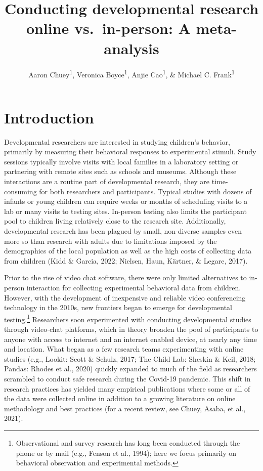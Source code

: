 \documentclass[
  man,floatsintext]{apa6}
\title{Conducting developmental research online vs.~in-person: A meta-analysis}
\author{Aaron Chuey\textsuperscript{1}, Veronica Boyce\textsuperscript{1}, Anjie Cao\textsuperscript{1}, \& Michael C. Frank\textsuperscript{1}}
\date{}
\affiliation{\vspace{0.5cm}\textsuperscript{1} Stanford University, Department of Psychology}
\begin{document}
\maketitle

\hypertarget{introduction}{%
\section{Introduction}\label{introduction}}

Developmental researchers are interested in studying children's behavior, primarily by measuring their behavioral responses to experimental stimuli. Study sessions typically involve visits with local families in a laboratory setting or partnering with remote sites such as schools and museums. Although these interactions are a routine part of developmental research, they are time-consuming for both researchers and participants. Typical studies with dozens of infants or young children can require weeks or months of scheduling visits to a lab or many visits to testing sites. In-person testing also limits the participant pool to children living relatively close to the research site. Additionally, developmental research has been plagued by small, non-diverse samples even more so than research with adults due to limitations imposed by the demographics of the local population as well as the high costs of collecting data from children (Kidd \& Garcia, 2022; Nielsen, Haun, Kärtner, \& Legare, 2017).

Prior to the rise of video chat software, there were only limited alternatives to in-person interaction for collecting experimental behavioral data from children. However, with the development of inexpensive and reliable video conferencing technology in the 2010s, new frontiers began to emerge for developmental testing.\footnote{Observational and survey research has long been conducted through the phone or by mail (e.g., Fenson et al., 1994); here we focus primarily on behavioral observation and experimental methods.} Researchers soon experimented with conducting developmental studies through video-chat platforms, which in theory broaden the pool of participants to anyone with access to internet and an internet enabled device, at nearly any time and location. What began as a few research teams experimenting with online studies (e.g., Lookit: Scott \& Schulz, 2017; The Child Lab: Sheskin \& Keil, 2018; Pandas: Rhodes et al., 2020) quickly expanded to much of the field as researchers scrambled to conduct safe research during the Covid-19 pandemic. This shift in research practices has yielded many empirical publications where some or all of the data were collected online in addition to a growing literature on online methodology and best practices (for a recent review, see Chuey, Asaba, et al., 2021).
\end{document}
